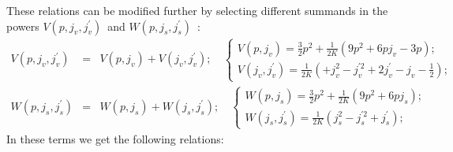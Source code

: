 \documentclass{article}
\begin{document}
These relations can be modified further by selecting different summands in
the powers $V\left( p,j_{v},j_{v}^{\prime }\right) $\ and $W\left(
p,j_{s},j_{s}^{\prime }\right) $\ : 
\begin{eqnarray*}
V\left( p,j_{v},j_{v}^{\prime }\right) &=&V\left( p,j_{v}\right) +V\left(
j_{v},j_{v}^{\prime }\right) ;\quad \left\{ 
\begin{array}{c}
V\left( p,j_{v}\right) =\frac{3}{2}p^{2}+\frac{1}{2K}\left(
9p^{2}+6pj_{v}-3p\right) ; \\ 
V\left( j_{v},j_{v}^{\prime }\right) =\frac{1}{2K}\left(
+j_{v}^{2}-j_{v}^{\prime 2}+2j_{v}^{\prime }-j_{v}-\frac{1}{2}\right) ;
\end{array}
\right. \\
W\left( p,j_{s},j_{s}^{\prime }\right) &=&W\left( p,j_{s}\right) +W\left(
j_{s},j_{s}^{\prime }\right) ;\quad \left\{ 
\begin{array}{c}
W\left( p,j_{s}\right) =\frac{3}{2}p^{2}+\frac{1}{2K}\left(
9p^{2}+6pj_{s}\right) ; \\ 
W\left( j_{s},j_{s}^{\prime }\right) =\frac{1}{2K}\left(
j_{s}^{2}-j_{s}^{\prime 2}+j_{s}^{\prime }\right) ;
\end{array}
\right.
\end{eqnarray*}
In these terms we get the following relations:
\end{document}
